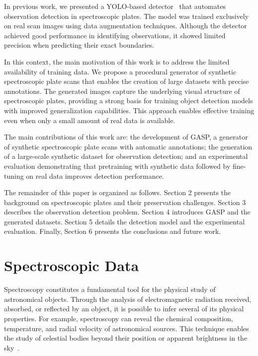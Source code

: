 \documentclass[runningheads]{llncs}
\begin{document}
In previous work, we presented a YOLO-based detector~\cite{ronchetti2023software} that automates observation detection in spectroscopic plates. The model was trained exclusively on real scan images using data augmentation techniques. Although the detector achieved good performance in identifying observations, it showed limited precision when predicting their exact boundaries.

In this context, the main motivation of this work is to address the limited availability of training data. We propose a procedural generator of synthetic spectroscopic plate scans that enables the creation of large datasets with precise annotations. The generated images capture the underlying visual structure of spectroscopic plates, providing a strong basis for training object detection models with improved generalization capabilities. This approach enables effective training even when only a small amount of real data is available.

The main contributions of this work are: the development of GASP, a generator of synthetic spectroscopic plate scans with automatic annotations; the generation of a large-scale synthetic dataset for observation detection; and an experimental evaluation demonstrating that pretraining with synthetic data followed by fine-tuning on real data improves detection performance.

The remainder of this paper is organized as follows. Section 2 presents the background on spectroscopic plates and their preservation challenges. Section 3 describes the observation detection problem. Section 4 introduces GASP and the generated datasets. Section 5 details the detection model and the experimental evaluation. Finally, Section 6 presents the conclusions and future work.

\section{Spectroscopic Data}

Spectroscopy constitutes a fundamental tool for the physical study of astronomical objects. Through the analysis of electromagnetic radiation received, absorbed, or reflected by an object, it is possible to infer several of its physical properties. For example, spectroscopy can reveal 
the chemical composition, temperature, and radial velocity of astronomical sources. This technique enables the study of celestial bodies beyond their position or apparent brightness in the sky~\cite{gray2021observation}.
\end{document}
